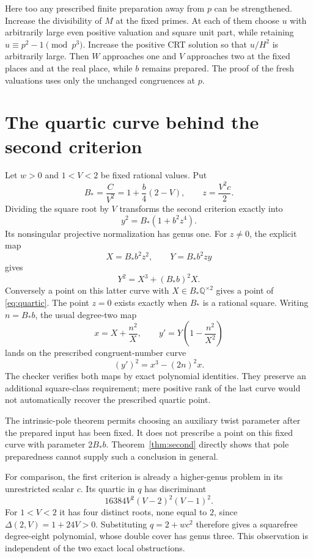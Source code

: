 \documentclass[11pt,a4paper]{article}
\newcommand{\Q}{\mathbb Q}\newcommand{\Z}{\mathbb Z}
\begin{document}
Here too any prescribed finite preparation away from $p$ can
be strengthened. Increase the divisibility of $M$ at the fixed
primes. At each of them choose $u$ with arbitrarily large even
positive valuation and square unit part, while retaining
$u\equiv p^2-1\pmod{p^3}$. Increase the positive CRT solution
so that $u/H^2$ is arbitrarily large. Then $W$ approaches one
and $V$ approaches two at the fixed places and at the real place,
while $b$ remains prepared. The proof of the fresh valuations
uses only the unchanged congruences at $p$.

\section{The quartic curve behind the second criterion}

Let $w>0$ and $1<V<2$ be fixed rational values. Put
\[
 B_*=\frac C{V^2}=1+\frac b4(2-V),\qquad z=\frac{V^2c}{2}.
\]
Dividing the square root by $V$ transforms the second criterion
exactly into
\begin{equation}\label{eq:quartic}
                         y^2=B_*(1+b^2z^4).
\end{equation}
Its nonsingular projective normalization has genus one. For
$z\ne0$, the explicit map
\[
 X=B_*b^2z^2,\qquad Y=B_*b^2zy
\]
gives
\[
                         Y^2=X^3+(B_*b)^2X.
\]
Conversely a point on this latter curve with
$X\in B_*\Q^{\times2}$ gives a point of \eqref{eq:quartic}.
The point $z=0$ exists exactly when $B_*$ is a rational square.
Writing $n=B_*b$, the usual degree-two map
\[
 x=X+\frac{n^2}{X},\qquad y'=Y\left(1-\frac{n^2}{X^2}\right)
\]
lands on the prescribed congruent-number curve
\[
                         (y')^2=x^3-(2n)^2x.
\]
The checker verifies both maps by exact polynomial identities.
They preserve an additional square-class requirement; mere positive
rank of the last curve would not automatically recover the
prescribed quartic point.

The intrinsic-pole theorem permits choosing an auxiliary twist
parameter after the prepared input has been fixed. It does not
prescribe a point on this fixed curve with parameter $2B_*b$.
Theorem~\ref{thm:second} directly shows that pole preparedness
cannot supply such a conclusion in general.

For comparison, the first criterion is already a higher-genus
problem in its unrestricted scalar $c$. Its quartic in $q$ has
discriminant
\[
                 16384V^2(V-2)^2(V-1)^2.
\]
For $1<V<2$ it has four distinct roots, none equal to $2$,
since $\Delta(2,V)=1+24V>0$. Substituting $q=2+wc^2$
therefore gives a squarefree degree-eight polynomial, whose
double cover has genus three. This observation is independent
of the two exact local obstructions.
\end{document}
